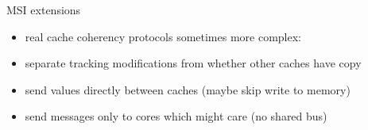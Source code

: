 \begin{frame}{MSI extensions}
\begin{itemize}
\item real cache coherency protocols sometimes more complex:
\vspace{.5cm}
\item separate tracking modifications from whether other caches have copy
\item send values directly between caches (maybe skip write to memory)
\item send messages only to cores which might care (no shared bus)
\end{itemize}
\end{frame}
